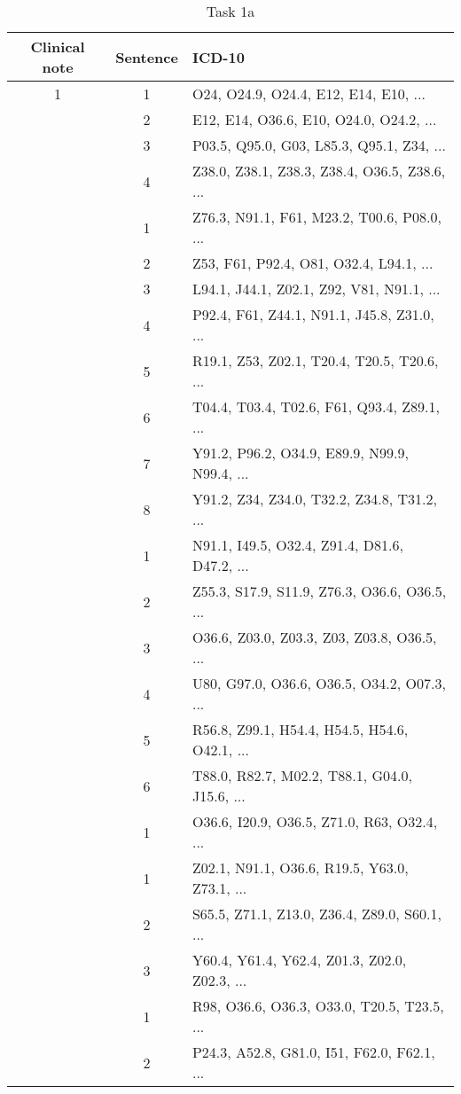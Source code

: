 \begin{table}[htbp] \footnotesize \center
\caption{Task 1a\label{tab:task1a}}
\begin{tabularx}{\textwidth}{c c X}
    \toprule
    Clinical note & Sentence & ICD-10 \\
    \midrule
	1 & 1 & O24, O24.9, O24.4, E12, E14, E10, ... \\
	 & 2 & E12, E14, O36.6, E10, O24.0, O24.2, ... \\
	 & 3 & P03.5, Q95.0, G03, L85.3, Q95.1, Z34, ... \\
	 & 4 & Z38.0, Z38.1, Z38.3, Z38.4, O36.5, Z38.6, ... \\
	\addlinespace
	2 & 1 & Z76.3, N91.1, F61, M23.2, T00.6, P08.0, ... \\
	 & 2 & Z53, F61, P92.4, O81, O32.4, L94.1, ... \\
	 & 3 & L94.1, J44.1, Z02.1, Z92, V81, N91.1, ... \\
	 & 4 & P92.4, F61, Z44.1, N91.1, J45.8, Z31.0, ... \\
	 & 5 & R19.1, Z53, Z02.1, T20.4, T20.5, T20.6, ... \\
	 & 6 & T04.4, T03.4, T02.6, F61, Q93.4, Z89.1, ... \\
	 & 7 & Y91.2, P96.2, O34.9, E89.9, N99.9, N99.4, ... \\
	 & 8 & Y91.2, Z34, Z34.0, T32.2, Z34.8, T31.2, ... \\
	\addlinespace
	3 & 1 & N91.1, I49.5, O32.4, Z91.4, D81.6, D47.2, ... \\
	 & 2 & Z55.3, S17.9, S11.9, Z76.3, O36.6, O36.5, ... \\
	 & 3 & O36.6, Z03.0, Z03.3, Z03, Z03.8, O36.5, ... \\
	 & 4 & U80, G97.0, O36.6, O36.5, O34.2, O07.3, ... \\
	 & 5 & R56.8, Z99.1, H54.4, H54.5, H54.6, O42.1, ... \\
	 & 6 & T88.0, R82.7, M02.2, T88.1, G04.0, J15.6, ... \\
	\addlinespace
	4 & 1 & O36.6, I20.9, O36.5, Z71.0, R63, O32.4, ... \\
	\addlinespace
	5 & 1 & Z02.1, N91.1, O36.6, R19.5, Y63.0, Z73.1, ... \\
	 & 2 & S65.5, Z71.1, Z13.0, Z36.4, Z89.0, S60.1, ... \\
	 & 3 & Y60.4, Y61.4, Y62.4, Z01.3, Z02.0, Z02.3, ... \\
	\addlinespace
	6 & 1 & R98, O36.6, O36.3, O33.0, T20.5, T23.5, ... \\
	 & 2 & P24.3, A52.8, G81.0, I51, F62.0, F62.1, ... \\

\end{tabularx}
\end{table}
